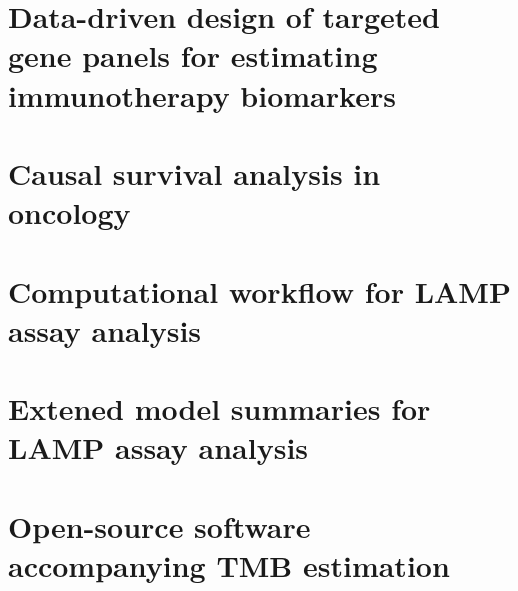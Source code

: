 \documentclass[12pt,twoside,openright]{report}
\theoremstyle{definition}
\begin{document}


\chapter{Data-driven design of targeted gene panels for estimating immunotherapy biomarkers \label{chap:tmb_estimation}}



\chapter{Causal survival analysis in oncology\label{chap:causal_genomics}}






\appendix

\chapter{Computational workflow for LAMP assay analysis}


\chapter{Extened model summaries for LAMP assay analysis}


\chapter{Open-source software accompanying TMB estimation}

\end{document}

